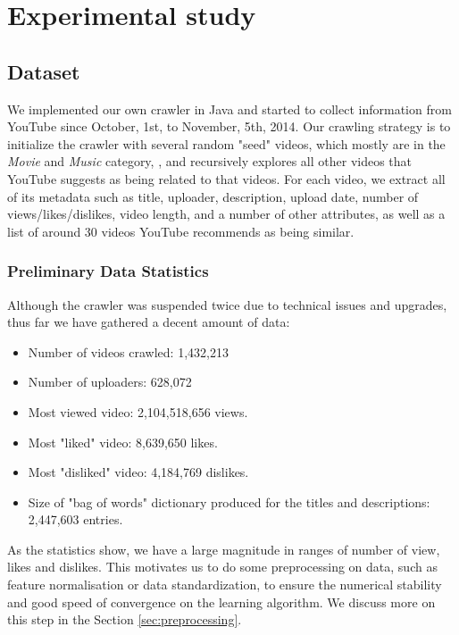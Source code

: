 \section{Experimental study}
\label{sec:experiment}

	\subsection{Dataset}
	We implemented our own crawler in Java and started to collect information from YouTube since October, 1st, to November, 5th, 2014. Our crawling strategy is to initialize the crawler with several random "seed" videos, which mostly are in the \textit{Movie} and \textit{Music} category, , and recursively explores all other videos that YouTube suggests as being related to that videos. For each video, we extract all of its metadata such as title, uploader, description, upload date, number of views/likes/dislikes, video length, and a number of other attributes, as well as a list of around 30 videos YouTube recommends as being similar. 

		\subsubsection{Preliminary Data Statistics}

		Although the crawler was suspended twice due to technical issues and upgrades, thus far we have gathered a decent amount of data:

		\begin{itemize}
			\item Number of videos crawled: 1,432,213
			\item Number of uploaders: 628,072
			\item Most viewed video: 2,104,518,656 views.
			\item Most "liked" video: 8,639,650 likes.
			\item Most "disliked" video: 4,184,769 dislikes.
			\item Size of "bag of words" dictionary produced for the titles and descriptions: 2,447,603 entries.
		\end{itemize}

		As the statistics show, we have a large magnitude in ranges of number of view, likes and dislikes. This motivates us to do some preprocessing on data, such as feature normalisation or data standardization, to ensure the numerical stability and good speed of convergence on the learning algorithm. We discuss more on this step in the Section \ref{sec:preprocessing}.
		

